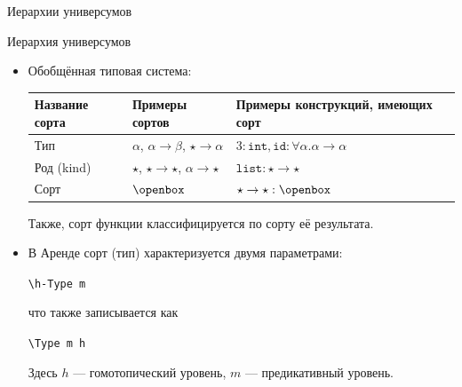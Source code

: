 \documentclass[aspectratio=169,dvipsnames,usenames]{beamer}
\begin{document}
\newtheorem{dfn}{Определение}[section]
\newtheorem{nte}{Замечание}[section]

\newtheorem{axiom}{Аксиома}[section]
\newtheorem{thm}{Теорема}[section]
\newtheorem{lmm}[theorem]{Лемма}
\newtheorem{statement}{Утверждение}[section]
\newtheorem{oun_paragraph}{Пункт}[section]
\newtheorem{cons}{Следствие}[section]
\newtheorem*{exm}{Пример}

\newcommand{\comb}[1]{\operatorname{\mathcal{#1}}}
\newcommand{\func}[1]{\operatorname{#1}}
\newcommand{\reduction}[1]{{\color{OrangeRed}#1}}
\newcommand{\set}[1]{\left\{#1\right\}}

\def\from#1{\par \parbox{0.7\textwidth}{\par \hfill\raggedleft \it #1}} 

\begin{frame}{}
\begin{center}
{\LARGE Иерархии универсумов}
\end{center}
\end{frame}


\begin{frame}[fragile]{Иерархия универсумов}
\begin{itemize}

\item Обобщённая типовая система:

\vspace{0.3cm}\begin{tabular}{lll}
Название сорта & Примеры сортов & Примеры конструкций, имеющих сорт\\\hline
Тип & $\alpha$, $\alpha\rightarrow\beta$, $\star\rightarrow\alpha$ & $3:\texttt{int}, \texttt{id}: \forall\alpha.\alpha\rightarrow\alpha$\\
Род (kind) & $\star$, $\star\rightarrow\star$, $\alpha\rightarrow\star$ & $\texttt{list}: \star\rightarrow\star$\\
Сорт & $\openbox$ & $\star\rightarrow\star : \openbox$
\end{tabular}

Также, сорт функции классифицируется по сорту её результата.

\item В Аренде сорт (тип) характеризуется двумя параметрами:

\begin{center}\verb!\h-Type m!\end{center}что также записывается как\begin{center}\verb!\Type m h!\end{center}

Здесь $h$ --- гомотопический уровень, $m$ --- предикативный уровень.
\end{itemize}

\end{frame}
\end{document}
